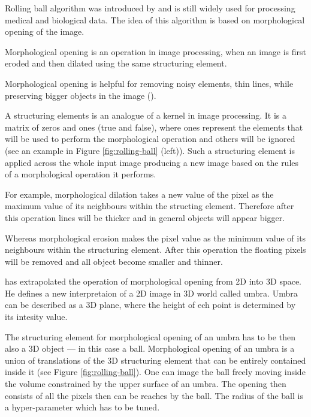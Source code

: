 Rolling ball algorithm was introduced by \cite{Sternberg_1983} and is still widely used for processing medical and biological data. The idea of this algorithm is based on morphological opening of the image.

\begin{definition}
	Morphological opening is an operation in image processing, when an image is first eroded and then dilated using the same structuring element.
\end{definition}

Morphological opening is helpful for removing noisy elements, thin lines, while preserving bigger objects in the image (\cite{morph_open}).

A structuring elements is an analogue of a kernel in image processing. It is a matrix of zeros and ones (true and false), where ones represent the elements that will be used to perform the morphological operation and others will be ignored (see an example in Figure \ref{fig:rolling-ball} (left)). Such a structuring element is applied across the whole input image producing a new image based on the rules of a morphological operation it performs.

For example, morphological dilation takes a new value of the pixel as the maximum value of its neighbours within the structing element. Therefore after this operation lines will be thicker and in general objects will appear bigger.

Whereas morphological erosion makes the pixel value as the minimum value of its neighbours within the structuring element. After this operation the floating pixels will be removed and all object become smaller and thinner.

\cite{Sternberg_1983} has extrapolated the operation of morphological opening from 2D into 3D space. He defines a new interpretaion of a 2D image in 3D world called umbra. Umbra can be described as a 3D plane, where the height of ech point is determined by its intesity value.

The structuring element for morphological opening of an umbra has to be then also a 3D object --- in this case a ball. Morphological opening of an umbra is a union of translations of the 3D structuring element that can be entirely contained inside it (see Figure \ref{fig:rolling-ball}). One can image the ball freely moving inside the volume constrained by the upper surface of an umbra. The opening then consists of all the pixels then can be reaches by the ball. The radius of the ball is a hyper-parameter which has to be tuned.

